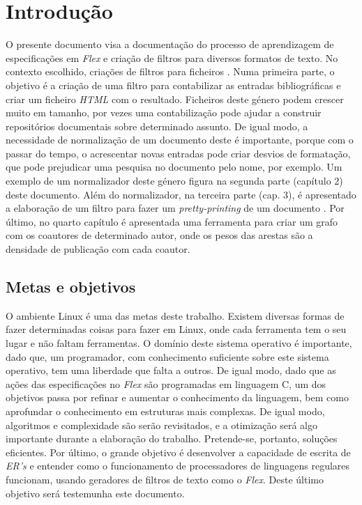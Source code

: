\chapter*{Introdução}\label{intro}


O presente documento visa a documentação do processo de aprendizagem de
especificações em \emph{Flex} e criação de filtros para diversos formatos de
texto. No contexto escolhido, criações de filtros para ficheiros
. Numa primeira parte, o objetivo é a criação de uma filtro para
contabilizar as entradas bibliográficas e criar um ficheiro \emph{HTML} com
o resultado. Ficheiros deste género podem crescer muito em tamanho, por vezes
uma contabilização pode ajudar a construir repositórios documentais sobre
determinado assunto. De igual modo, a necessidade de normalização de um
documento deste é importante, porque com o passar do tempo, o acrescentar novas
entradas pode criar desvios de formatação, que pode prejudicar uma pesquisa no
documento pelo nome, por exemplo. Um exemplo de um normalizador deste género
figura na segunda parte (capítulo 2) deste documento.  Além do normalizador, na
terceira parte (cap. 3), é apresentado a elaboração de um filtro para fazer um
\emph{pretty-printing} de um documento .  Por último, no quarto
capítulo é apresentada uma ferramenta para criar um grafo com os coautores de
determinado autor, onde os pesos das arestas são a densidade de publicação com
cada coautor.


\section*{Metas e objetivos} 

O ambiente Linux é uma das metas deste trabalho. Existem diversas formas de
fazer determinadas coisas para fazer em Linux, onde cada ferramenta tem o seu
lugar e não faltam ferramentas.  O domínio deste sistema operativo é importante,
dado que, um programador, com conhecimento suficiente sobre este sistema
operativo, tem uma liberdade que falta a outros. De igual modo, dado que as
ações das especificações no \emph{Flex} são programadas em linguagem C, um dos
objetivos passa por refinar e aumentar o conhecimento da linguagem, bem como
aprofundar o conhecimento em estruturas mais complexas. De igual modo,
algoritmos e complexidade são serão revisitados, e a otimização será algo
importante durante a elaboração do trabalho. Pretende-se, portanto, soluções
eficientes. Por último, o grande objetivo é desenvolver a capacidade de escrita
de \emph{ER's} e entender como o funcionamento de processadores de linguagens
regulares funcionam, usando geradores de filtros de texto como o \emph{Flex}.
Deste último objetivo será testemunha este documento.  


